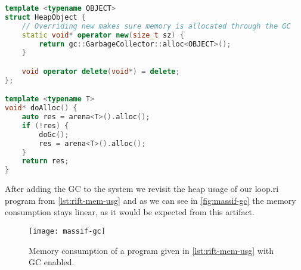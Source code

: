 \begin{lstlisting}[language=cpp, caption={Overriding the new oparator.}, label={lst:gc5}]
template <typename OBJECT>
struct HeapObject {
    // Overriding new makes sure memory is allocated through the GC
    static void* operator new(size_t sz) {
        return gc::GarbageCollector::alloc<OBJECT>();
    }

    void operator delete(void*) = delete;
};

template <typename T>
void* doAlloc() {
    auto res = arena<T>().alloc();
    if (!res) {
        doGc();
        res = arena<T>().alloc();
    }
    return res;
}
\end{lstlisting}

After adding the GC to the system we revisit the heap usage of our loop.ri program from \autoref{lst:rift-mem-usg} and as we can see in \autoref{fig:massif-gc} the memory consumption stays linear, as it would be expected from this artifact.

\begin{figure}[h]
\centering
\texttt{[image: massif-gc]}
\caption{Memory consumption of a \rift program given in \autoref{lst:rift-mem-usg} with GC enabled.}
\label{fig:massif-gc}
\end{figure}

